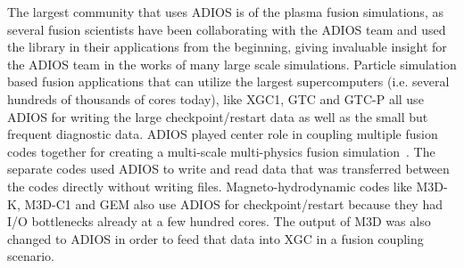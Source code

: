 
The largest community that uses ADIOS is of the plasma fusion simulations, as several fusion scientists have been collaborating with the ADIOS team and used the library in their applications from the beginning, giving invaluable insight for the ADIOS team in the works of many large scale simulations. Particle simulation based fusion applications that can utilize the largest  supercomputers (i.e. several hundreds of thousands of cores today), like XGC1, GTC and GTC-P all use ADIOS for writing the large checkpoint/restart data as well as the small but frequent diagnostic data. ADIOS played center role in coupling multiple fusion codes together for creating a multi-scale multi-physics fusion simulation~\cite{ADIOS:Docan:ccgrid10}. The separate codes used ADIOS to write and read data that was transferred between the codes directly without writing files. Magneto-hydrodynamic codes like M3D-K, M3D-C1 and GEM also use ADIOS for checkpoint/restart because they had I/O bottlenecks already at a few hundred cores. The output of M3D was also changed to ADIOS in order to feed that data into XGC in a fusion coupling scenario. 


